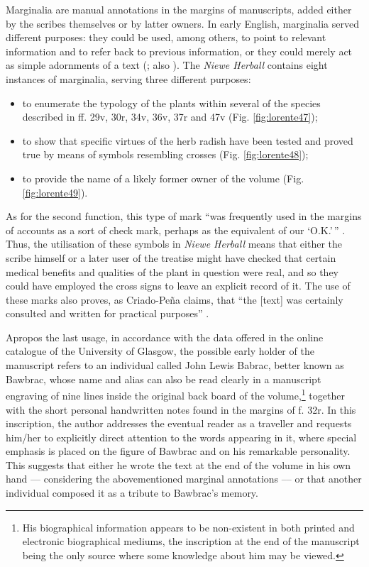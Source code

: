\documentclass{article}
\begin{document}
Marginalia are manual annotations in the
margins of manuscripts, added either by the scribes themselves or by latter
owners. In early English, marginalia served different purposes: they could be used, among others, to point to relevant
information and to refer back to previous information, or they could
merely act as simple adornments of a text (\cite[35]{criado_pena_elizabeth_2019}; also
\cite[247]{beal_dictionary_2008}). The \emph{Niewe Herball} contains eight
instances of marginalia, serving three different purposes: 
\begin{itemize}
    \item to enumerate the typology of the plants
within several of the species described in ff. 29v, 30r, 34v, 36v, 37r
and 47v (Fig. \ref{fig:lorente47});
    \item to show that specific virtues of the herb
radish have been tested and proved true by means of symbols resembling
crosses (Fig. \ref{fig:lorente48});
    \item to provide the name of a likely former
owner of the volume (Fig. \ref{fig:lorente49}).
\end{itemize}

As for the second function, this type of mark ``was frequently used in the margins of
accounts as a sort of check mark, perhaps as the equivalent of our
`O.K.'\,'' \citep[134]{tannenbaum_handwriting_1930}. Thus, the utilisation of these symbols in \emph{Niewe
Herball} means that either the scribe himself or a later user of
the treatise might have checked that certain medical benefits and
qualities of the plant in question were real, and so they could have
employed the cross signs to leave an explicit record of it. The use of
these marks also proves, as Criado-Peña claims, that ``the {[}text{]}
was certainly consulted and written for practical purposes'' \citep[35]{criado_pena_elizabeth_2019}.

Apropos the last usage, in accordance with the data offered in the
online catalogue of the University of Glasgow, the possible early holder
of the manuscript refers to an individual called John Lewis Babrac,
better known as Bawbrac, whose name and alias can also be read clearly
in a manuscript engraving of nine lines inside the original back board of
the volume,\footnote{His biographical information appears to be
  non-existent in both printed and electronic biographical mediums, the
  inscription at the end of the manuscript being the only source where
  some knowledge about him may be viewed.} together with the short
personal handwritten notes found in the margins of f. 32r. In this
inscription, the author addresses the eventual reader as a traveller and
requests him/her to explicitly direct attention to the words appearing
in it, where special emphasis is placed on the figure of Bawbrac and on
his remarkable personality. This suggests that either he
wrote the text at the end of the volume in his own hand –– considering the abovementioned marginal annotations –– 
or that another individual composed it as a tribute to
Bawbrac's memory.
\end{document}
